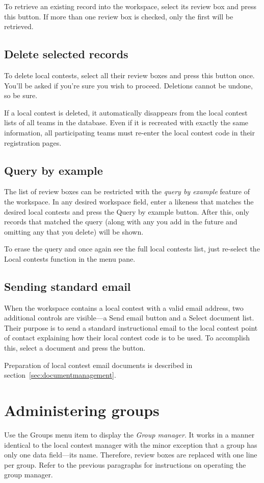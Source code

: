 \documentclass[11pt,letterpaper]{refart}
\def\ui#1{\textsf{#1}}
\begin{document}
To retrieve an existing record into the workspace, select 
its review box and press this button. If more than one review box is
checked, only the first will be retrieved. 

\subsection{Delete selected records}
To delete local contests, select all their review boxes and press this button
once. You'll be asked if you're sure you wish to proceed. Deletions cannot
be undone, so be sure. 

If a local contest is deleted, it automatically disappears from the local contest
lists of all teams in the database. Even if it is recreated with exactly the same
information, all participating teams must re-enter the local contest code in
their registration pages.

\subsection{Query by example}
\label{sec:qbe}
The list of review boxes can be restricted with the \emph{query by example}
feature of the workspace. In any desired workspace field, enter a likeness
that matches the desired local contests and press the \ui{Query by example}
button. After this, only records that matched the query (along with any you
add in the future and omitting any that you delete) will be shown.

To erase the query and once again see the full local contests list, just re-select
the \ui{Local contests} function in the menu pane.

\subsection{Sending standard email}
When the workspace contains a local contest with a valid email address,
two additional controls are visible---a \ui{Send email} button and a 
\ui{Select document} list. Their purpose is to send a standard instructional 
email to the local contest point of contact explaining how their local 
contest code is to be used. To accomplish this, select a document and 
press the button.

Preparation of local contest email documents is described 
in section~\ref{sec:documentmanagement}.

\section{Administering groups}
Use the \ui{Groups} menu item to display the \emph{Group manager}. It 
works in a manner identical to the local contest manager with the minor 
exception that a group has only one data field---its name. Therefore,
review boxes are replaced with one line per group. Refer to the previous
paragraphs for instructions on operating the group manager.
\end{document}
